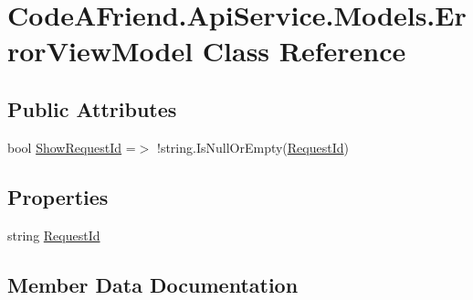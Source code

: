 \hypertarget{class_code_a_friend_1_1_api_service_1_1_models_1_1_error_view_model}{}\section{Code\+A\+Friend.\+Api\+Service.\+Models.\+Error\+View\+Model Class Reference}
\label{class_code_a_friend_1_1_api_service_1_1_models_1_1_error_view_model}
\subsection*{Public Attributes}
\begin{DoxyCompactItemize}
\item 
bool \mbox{\hyperlink{class_code_a_friend_1_1_api_service_1_1_models_1_1_error_view_model_a8bc3d8ee7b7604516c1ac54b7080c761}{Show\+Request\+Id}} =$>$ !string.\+Is\+Null\+Or\+Empty(\mbox{\hyperlink{class_code_a_friend_1_1_api_service_1_1_models_1_1_error_view_model_aa19824bbfb14fe33283a6c282b653388}{Request\+Id}})
\end{DoxyCompactItemize}
\subsection*{Properties}
\begin{DoxyCompactItemize}
\item 
string \mbox{\hyperlink{class_code_a_friend_1_1_api_service_1_1_models_1_1_error_view_model_aa19824bbfb14fe33283a6c282b653388}{Request\+Id}}
\end{DoxyCompactItemize}


\subsection{Member Data Documentation}
\mbox{\label{class_code_a_friend_1_1_api_service_1_1_models_1_1_error_view_model_a8bc3d8ee7b7604516c1ac54b7080c761}} 
